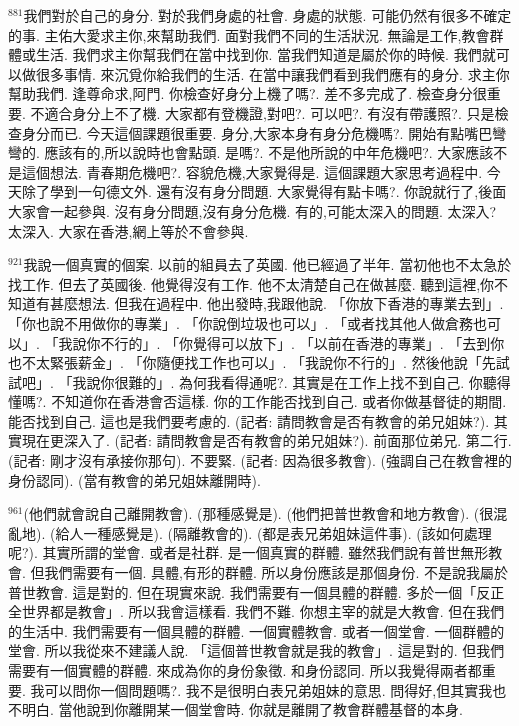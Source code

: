 \documentclass{book}
\begin{document}
$^{881}$我們對於自己的身分.
對於我們身處的社會.
身處的狀態.
可能仍然有很多不確定的事.
主佑大愛求主你,來幫助我們.
面對我們不同的生活狀況.
無論是工作,教會群體或生活.
我們求主你幫我們在當中找到你.
當我們知道是屬於你的時候.
我們就可以做很多事情.
來沉覓你給我們的生活.
在當中讓我們看到我們應有的身分.
求主你幫助我們.
逢尊命求,阿門.
你檢查好身分上機了嗎?.
差不多完成了.
檢查身分很重要.
不適合身分上不了機.
大家都有登機證,對吧?.
可以吧?.
有沒有帶護照?.
只是檢查身分而已.
今天這個課題很重要.
身分,大家本身有身分危機嗎?.
開始有點嘴巴彎彎的.
應該有的,所以說時也會點頭.
是嗎?.
不是他所說的中年危機吧?.
大家應該不是這個想法.
青春期危機吧?.
容貌危機,大家覺得是.
這個課題大家思考過程中.
今天除了學到一句德文外.
還有沒有身分問題.
大家覺得有點卡嗎?.
你說就行了,後面大家會一起參與.
沒有身分問題,沒有身分危機.
有的,可能太深入的問題.
太深入? 太深入.
大家在香港,網上等於不會參與.

$^{921}$我說一個真實的個案.
以前的組員去了英國.
他已經過了半年.
當初他也不太急於找工作.
但去了英國後.
他覺得沒有工作.
他不太清楚自己在做甚麼.
聽到這裡,你不知道有甚麼想法.
但我在過程中.
他出發時,我跟他說.
「你放下香港的專業去到」.
「你也說不用做你的專業」.
「你說倒垃圾也可以」.
「或者找其他人做倉務也可以」.
「我說你不行的」.
「你覺得可以放下」.
「以前在香港的專業」.
「去到你也不太緊張薪金」.
「你隨便找工作也可以」.
「我說你不行的」.
然後他說「先試試吧」.
「我說你很難的」.
為何我看得通呢?.
其實是在工作上找不到自己.
你聽得懂嗎?.
不知道你在香港會否這樣.
你的工作能否找到自己.
或者你做基督徒的期間.
能否找到自己.
這也是我們要考慮的.
(記者: 請問教會是否有教會的弟兄姐妹?).
其實現在更深入了.
(記者: 請問教會是否有教會的弟兄姐妹?).
前面那位弟兄.
第二行.
(記者: 剛才沒有承接你那句).
不要緊.
(記者: 因為很多教會).
(強調自己在教會裡的身份認同).
(當有教會的弟兄姐妹離開時).

$^{961}$(他們就會說自己離開教會).
(那種感覺是).
(他們把普世教會和地方教會).
(很混亂地).
(給人一種感覺是).
(隔離教會的).
(都是表兄弟姐妹這件事).
(該如何處理呢?).
其實所謂的堂會.
或者是社群.
是一個真實的群體.
雖然我們說有普世無形教會.
但我們需要有一個.
具體,有形的群體.
所以身份應該是那個身份.
不是說我屬於普世教會.
這是對的.
但在現實來說.
我們需要有一個具體的群體.
多於一個「反正全世界都是教會」.
所以我會這樣看.
我們不難.
你想主宰的就是大教會.
但在我們的生活中.
我們需要有一個具體的群體.
一個實體教會.
或者一個堂會.
一個群體的堂會.
所以我從來不建議人說.
「這個普世教會就是我的教會」.
這是對的.
但我們需要有一個實體的群體.
來成為你的身份象徵.
和身份認同.
所以我覺得兩者都重要.
我可以問你一個問題嗎?.
我不是很明白表兄弟姐妹的意思.
問得好,但其實我也不明白.
當他說到你離開某一個堂會時.
你就是離開了教會群體基督的本身.
\end{document}
